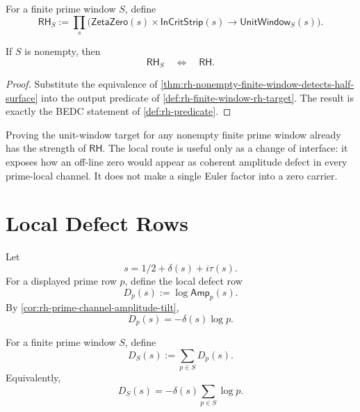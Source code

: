 \begin{definition}
\label{def:rh-finite-window-rh-target}
For a finite prime window $S$, define
$$
\mathsf{RH}_{S}
:=
\prod_s
\bigl(
\mathsf{ZetaZero}(s)\times\mathsf{InCritStrip}(s)
\to
\mathsf{UnitWindow}_{S}(s)
\bigr).
$$
\end{definition}

\begin{theorem}
\label{thm:rh-nonempty-window-rh-full-strength}
If $S$ is nonempty, then
$$
\mathsf{RH}_{S}
\quad\Longleftrightarrow\quad
\mathsf{RH}.
$$
\end{theorem}

\begin{proof}
Substitute the equivalence of
\autoref{thm:rh-nonempty-finite-window-detects-half-surface} into the
output predicate of \autoref{def:rh-finite-window-rh-target}. The result is
exactly the BEDC statement of \autoref{def:rh-predicate}.
\end{proof}

\begin{principle}
\label{prin:rh-window-localization-interface-not-strength}
Proving the unit-window target for any nonempty finite prime window already
has the strength of $\mathsf{RH}$. The local route is useful only as a
change of interface: it exposes how an off-line zero would appear as
coherent amplitude defect in every prime-local channel. It does not make a
single Euler factor into a zero carrier.
\end{principle}

\section{Local Defect Rows}
\label{sec:rh-local-defect-rows}

\begin{definition}
\label{def:rh-prime-defect-row}
Let
$$
s=1/2+\delta(s)+i\tau(s).
$$
For a displayed prime row $p$, define the local defect row
$$
D_{p}(s):=\log\mathsf{Amp}_{p}(s).
$$
By \autoref{cor:rh-prime-channel-amplitude-tilt},
$$
D_{p}(s)=-\delta(s)\log p.
$$
\end{definition}

\begin{definition}
\label{def:rh-finite-window-total-defect}
For a finite prime window $S$, define
$$
D_{S}(s):=\sum_{p\in S}D_{p}(s).
$$
Equivalently,
$$
D_{S}(s)
=
-\delta(s)\sum_{p\in S}\log p.
$$
\end{definition}

